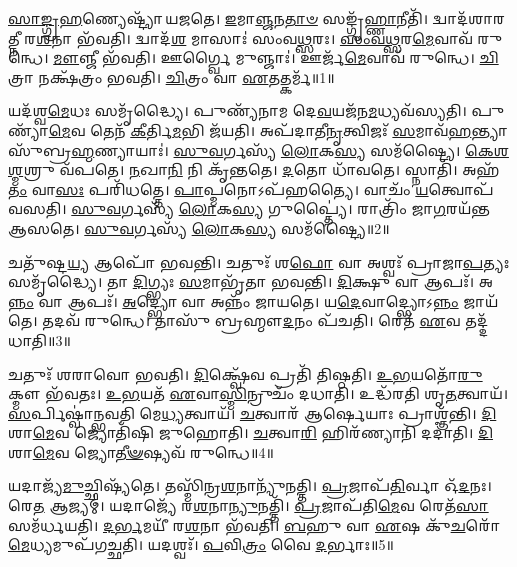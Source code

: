 \setcounter{anuvakam}{0}

\-\ul{𑌸𑌾}\-\-\ul{𑌙𑍍𑌗𑍍𑌰}\-\-\ul{𑌹}\-𑌣𑍍𑌯𑍇𑌷𑍍𑌟𑍍𑌯𑌾᳴ 𑌯𑌜𑌤𑍇।
\-\ul{𑌇}\-𑌮𑌾\-\ul{𑌞𑍍𑌜}\-𑌨\-\ul{𑌤𑌾}\-\-\ul{𑍞} 𑌸𑌙𑍍𑌗𑍃᳴\-\ul{𑌹𑍍𑌣𑌾}\-𑌨𑍀𑌤𑌿᳴।
𑌦𑍍𑌵𑌾𑌦᳴𑌶𑌾𑌰𑌤𑍍𑌨𑍀 𑌰\-\ul{𑌶}\-𑌨𑌾 𑌭᳴𑌵𑌤𑌿।
𑌦𑍍𑌵𑌾𑌦᳴\-\ul{𑌶} 𑌮𑌾𑌸𑌾𑌃॑ 𑌸𑌂𑌵\-\ul{𑌥𑍍𑌸}\-𑌰𑌃।
\-\ul{𑌸𑌂}\-\-\ul{𑌵}\-\-\ul{𑌥𑍍𑌸}\-𑌰\-\ul{𑌮𑍇}\-𑌵𑌾𑌵᳴ 𑌰𑍁𑌨𑍍𑌧𑍇।
\-\ul{𑌮𑍗}\-𑌞𑍍𑌜𑍀 𑌭᳴𑌵𑌤𑌿।
𑌊𑌰𑍍𑌗𑍍𑌵𑍈 𑌮𑍁𑌞𑍍𑌜𑌾𑌃॑।
𑌊𑌰𑍍𑌜᳴\-\-\ul{𑌮𑍇}\-𑌵𑌾𑌵᳴ 𑌰𑍁𑌨𑍍𑌧𑍇।
\-\ul{𑌚𑌿}\-𑌤𑍍𑌰𑌾 𑌨𑌕𑍍𑌷᳴𑌤𑍍𑌰𑌂 𑌭𑌵𑌤𑌿।
\-\ul{𑌚𑌿}\-𑌤𑍍𑌰𑌂 𑌵𑌾 \ul{𑌏}\-𑌤𑌤𑍍𑌕𑌰𑍍𑌮᳴॥1॥

𑌯𑌦᳴𑌶𑍍𑌵\-\ul{𑌮𑍇}\-𑌧𑌃 𑌸𑌮𑍃᳴𑌦𑍍𑌧𑍍𑌯𑍈।
𑌪𑍁𑌣𑍍𑌯᳴𑌨𑌾𑌮 𑌦𑍇\-\ul{𑌵}\-𑌯𑌜᳴𑌨\-\ul{𑌮}\-𑌧𑍍𑌯𑌵᳴𑌸𑍍𑌯𑌤𑌿।
𑌪𑍁𑌣𑍍𑌯𑌾᳴\-\ul{𑌮𑍇}\-𑌵 𑌤𑍇𑌨᳴ \ul{𑌕𑍀}\-𑌰𑍍𑌤𑌿\-\ul{𑌮}\-𑌭𑌿 𑌜᳴𑌯𑌤𑌿।
𑌅𑌪᳴𑌦𑌾𑌤𑍀\-\ul{𑌨𑍃}\-𑌤𑍍𑌵𑌿𑌜𑌃᳴ \ul{𑌸}\-𑌮𑌾𑌵᳴\-\ul{𑌹}\-𑌨𑍍𑌤𑍍𑌯𑌾 𑌸𑍁᳴𑌬𑍍𑌰\-\ul{𑌹𑍍𑌮}\-𑌣𑍍𑌯𑌾𑌯𑌾𑌃॑।
\-\ul{𑌸𑍁}\-\-\ul{𑌵}\-𑌰𑍍𑌗𑌸𑍍𑌯᳴ \ul{𑌲𑍋}\-𑌕\-\ul{𑌸𑍍𑌯} 𑌸𑌮᳴𑌷𑍍𑌟𑍍𑌯𑍈।
\-\ul{𑌕𑍇}\-\-\ul{𑌶}\-\-\ul{𑌶𑍍𑌮}\-𑌶𑍍𑌰𑍁 𑌵᳴𑌪𑌤𑍇।
\-\ul{𑌨}\-𑌖𑌾\-\ul{𑌨𑌿} 𑌨𑌿 𑌕𑍃᳴𑌨𑍍𑌤𑌤𑍇।
\-\ul{𑌦}\-𑌤𑍋 𑌧𑌾᳴𑌵𑌤𑍇।
𑌸𑍍𑌨𑌾𑌤𑌿᳴।
𑌅𑌹᳴\-\ul{𑌤𑌂} 𑌵𑌾\-\ul{𑌸𑌃} 𑌪𑌰𑌿᳴𑌧𑌤𑍍𑌤𑍇।
\-\ul{𑌪𑌾}\-𑌪𑍍𑌮𑌨𑍋\-𑌽𑌪᳴𑌹𑌤𑍍𑌯𑍈।
𑌵𑌾𑌚𑌂᳴ \ul{𑌯}\-𑌤𑍍𑌵𑍋𑌪᳴ 𑌵𑌸𑌤𑌿।
\-\ul{𑌸𑍁}\-\-\ul{𑌵}\-𑌰𑍍𑌗𑌸𑍍𑌯᳴ \ul{𑌲𑍋}\-𑌕\-\ul{𑌸𑍍𑌯} 𑌗𑍁𑌪𑍍𑌤𑍍𑌯𑍈॑।
𑌰𑌾𑌤𑍍𑌰𑌿𑌂᳴ 𑌜𑌾\-\ul{𑌗}\-𑌰𑌯᳴𑌨𑍍𑌤 𑌆𑌸𑌤𑍇।
\-\ul{𑌸𑍁}\-\-\ul{𑌵}\-𑌰𑍍𑌗𑌸𑍍𑌯᳴ \ul{𑌲𑍋}\-𑌕\-\ul{𑌸𑍍𑌯} 𑌸𑌮᳴𑌷𑍍𑌟𑍍𑌯𑍈॥2॥\anuvakamend[𑌕𑌰𑍍𑌮᳴ 𑌧\-\ul{𑌤𑍍𑌤𑍇} 𑌪𑌞𑍍𑌚᳴ 𑌚]

𑌚𑌤𑍁᳴𑌷𑍍𑌟\-\ul{𑌯𑍍𑌯} 𑌆𑌪𑍋᳴ 𑌭𑌵𑌨𑍍𑌤𑌿।
𑌚𑌤𑍁𑌃᳴ 𑌶\-\ul{𑌫𑍋} 𑌵𑌾 𑌅𑌶𑍍𑌵𑌃᳴ 𑌪𑍍𑌰𑌾𑌜𑌾\-\ul{𑌪}\-𑌤𑍍𑌯𑌃 𑌸𑌮𑍃᳴𑌦𑍍𑌧𑍍𑌯𑍈।
𑌤𑌾 \ul{𑌦𑌿}\-𑌗𑍍𑌭𑍍𑌯𑌃 \ul{𑌸}\-𑌮𑌾𑌭𑍃᳴𑌤𑌾 𑌭𑌵𑌨𑍍𑌤𑌿।
\-\ul{𑌦𑌿}\-𑌕𑍍𑌷𑍁 𑌵𑌾 𑌆𑌪𑌃᳴।
𑌅\-\ul{𑌨𑍍𑌨𑌂} 𑌵𑌾 𑌆𑌪𑌃᳴।
\-\ul{𑌅}\-𑌦𑍍𑌭𑍍𑌯𑍋 𑌵𑌾 𑌅𑌨𑍍𑌨𑌂᳴ 𑌜𑌾𑌯𑌤𑍇।
𑌯\-\ul{𑌦𑍇}\-𑌵𑌾𑌦𑍍𑌭𑍍𑌯𑍋\-𑌽\-\ul{𑌨𑍍𑌨𑌂} 𑌜𑌾𑌯᳴𑌤𑍇।
𑌤𑌦𑌵᳴ 𑌰𑍁𑌨𑍍𑌧𑍇।
𑌤𑌾𑌸𑍁᳴ 𑌬𑍍𑌰𑌹𑍍𑌮𑍗\-\ul{𑌦}\-𑌨𑌂 𑌪᳴𑌚𑌤𑌿।
𑌰𑍇𑌤᳴ \ul{𑌏}\-𑌵 𑌤𑌦𑍍𑌦᳴𑌧𑌾𑌤𑌿॥3॥

𑌚𑌤𑍁𑌃᳴ 𑌶𑌰𑌾𑌵𑍋 𑌭𑌵𑌤𑌿।
\-\ul{𑌦𑌿}\-𑌕𑍍𑌷𑍍𑌵𑍇᳴𑌵 𑌪𑍍𑌰𑌤𑌿᳴ 𑌤𑌿𑌷𑍍𑌠𑌤𑌿।
\-\ul{𑌉}\-\-\ul{𑌭}\-𑌯𑌤𑍋᳴\-\ul{𑌰𑍁}\-𑌕𑍍𑌮𑍗 𑌭᳴𑌵𑌤𑌃।
\-\ul{𑌉}\-\-\ul{𑌭}\-𑌯𑌤᳴ \ul{𑌏}\-𑌵𑌾\-\ul{𑌸𑍍𑌮𑌿}\-𑌨𑍍𑌰𑍁𑌚𑌂᳴ 𑌦𑌧𑌾𑌤𑌿।
𑌉𑌦𑍍𑌧᳴𑌰𑌤𑌿 𑌶𑍃\-\ul{𑌤}\-𑌤𑍍𑌵𑌾𑌯᳴।
\-\ul{𑌸}\-𑌰𑍍𑌪𑌿𑌷𑍍𑌵𑌾॑𑌨𑍍𑌭𑌵𑌤𑌿 𑌮𑍇\-\ul{𑌧𑍍𑌯}\-𑌤𑍍𑌵𑌾𑌯᳴।
\-\ul{𑌚}\-𑌤𑍍𑌵𑌾𑌰᳴ 𑌆𑌰𑍍\mbox{}\-\ul{𑌷𑍇}\-𑌯𑌾𑌃 𑌪𑍍𑌰𑌾𑌶𑍍𑌞᳴𑌨𑍍𑌤𑌿।
\-\ul{𑌦𑌿}\-𑌶𑌾\-\ul{𑌮𑍇}\-𑌵 𑌜𑍍𑌯𑍋𑌤𑌿᳴𑌷𑌿 𑌜𑍁𑌹𑍋𑌤𑌿।
\-\ul{𑌚}\-𑌤𑍍𑌵𑌾\-\ul{𑌰𑌿} 𑌹𑌿𑌰᳴𑌣𑍍𑌯𑌾𑌨𑌿 𑌦𑌦𑌾𑌤𑌿।
\-\ul{𑌦𑌿}\-𑌶𑌾\-\ul{𑌮𑍇}\-𑌵 𑌜𑍍𑌯𑍋\-\ul{𑌤𑍀}\-\-\ul{𑍟}\-𑌷𑍍𑌯𑌵᳴ 𑌰𑍁𑌨𑍍𑌧𑍇॥4॥

𑌯𑌦𑌾𑌜𑍍𑌯᳴\-\ul{𑌮𑍁}\-𑌚𑍍𑌛𑌿𑌷𑍍𑌯᳴𑌤𑍇।
𑌤𑌸𑍍𑌮𑌿᳴𑌨𑍍𑌰\-\ul{𑌶}\-𑌨𑌾𑌨𑍍𑌯𑍁᳴𑌨𑌤𑍍𑌤𑌿।
\-\ul{𑌪𑍍𑌰}\-𑌜𑌾𑌪᳴\-\ul{𑌤𑌿}\-𑌰𑍍𑌵𑌾 𑌓᳴\-\ul{𑌦}\-𑌨𑌃।
𑌰𑍇\-\ul{𑌤} 𑌆𑌜𑍍𑌯𑌮𑍍॑।
𑌯𑌦𑌾𑌜𑍍𑌯𑍇᳴ 𑌰\-\ul{𑌶}\-𑌨𑌾\-\ul{𑌨𑍍𑌯𑍁}\-𑌨𑌤𑍍𑌤𑌿᳴।
\-\ul{𑌪𑍍𑌰}\-𑌜𑌾𑌪᳴𑌤𑌿\-\ul{𑌮𑍇}\-𑌵 𑌰𑍇𑌤᳴\-\ul{𑌸𑌾} 𑌸𑌮᳴𑌰𑍍𑌧𑌯𑌤𑌿।
\-\ul{𑌦}\-\-\ul{𑌰𑍍𑌭}\-𑌮𑌯𑍀᳴ 𑌰\-\ul{𑌶}\-𑌨𑌾 𑌭᳴𑌵𑌤𑌿।
\-\ul{𑌬}\-𑌹𑍁 𑌵𑌾 \ul{𑌏}\-𑌷 𑌕𑍁᳴\-\ul{𑌚}\-𑌰𑍋᳴ \ul{𑌮𑍇}\-𑌧𑍍𑌯𑌮𑍁𑌪᳴𑌗𑌚𑍍𑌛𑌤𑌿।
𑌯𑌦𑌶𑍍𑌵𑌃᳴।
\-\ul{𑌪}\-𑌵𑌿\-\ul{𑌤𑍍𑌰𑌂} 𑌵𑍈 \ul{𑌦}\-𑌰𑍍𑌭𑌾𑌃॥5॥

